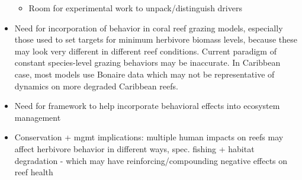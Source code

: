 \documentclass[]{article}
\providecommand{\tightlist}{%
  \setlength{\itemsep}{0pt}\setlength{\parskip}{0pt}}
\begin{document}
\begin{itemize}
  \begin{itemize}
  \tightlist
  \item
    Room for experimental work to unpack/distinguish drivers
  \end{itemize}
\item
  Need for incorporation of behavior in coral reef grazing models,
  especially those used to set targets for minimum herbivore biomass
  levels, because these may look very different in different reef
  conditions. Current paradigm of constant species-level grazing
  behaviors may be inaccurate. In Caribbean case, most models use
  Bonaire data which may not be representative of dynamics on more
  degraded Caribbean reefs.
\item
  Need for framework to help incorporate behavioral effects into
  ecosystem management
\item
  Conservation + mgmt implications: multiple human impacts on reefs may
  affect herbivore behavior in different ways, spec. fishing + habitat
  degradation - which may have reinforcing/compounding negative effects
  on reef health
\end{itemize}
\end{document}
